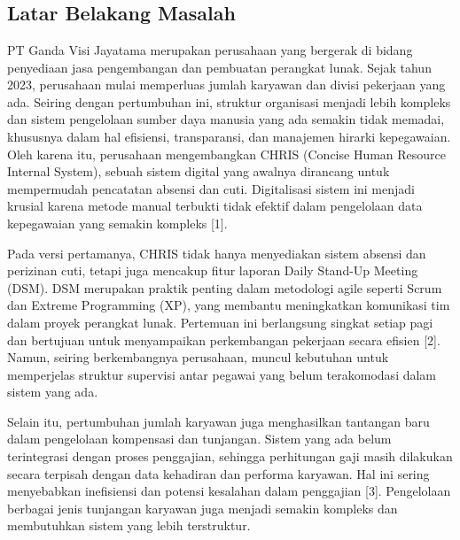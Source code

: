 \chapter{\babSatu}

\section{Latar Belakang Masalah}
PT Ganda Visi Jayatama merupakan perusahaan yang bergerak di bidang penyediaan 
jasa pengembangan dan pembuatan perangkat lunak. Sejak tahun 2023, perusahaan 
mulai memperluas jumlah karyawan dan divisi pekerjaan yang ada. Seiring dengan 
pertumbuhan ini, struktur organisasi menjadi lebih kompleks dan sistem pengelolaan 
sumber daya manusia yang ada semakin tidak memadai, khususnya dalam hal 
efisiensi, transparansi, dan manajemen hirarki kepegawaian. Oleh karena itu, 
perusahaan mengembangkan CHRIS (Concise Human Resource Internal System), sebuah 
sistem digital yang awalnya dirancang untuk mempermudah pencatatan absensi dan 
cuti. Digitalisasi sistem ini menjadi krusial karena metode manual terbukti tidak 
efektif dalam pengelolaan data kepegawaian yang semakin kompleks [1].

Pada versi pertamanya, CHRIS tidak hanya menyediakan sistem absensi dan perizinan 
cuti, tetapi juga mencakup fitur laporan Daily Stand-Up Meeting (DSM). DSM 
merupakan praktik penting dalam metodologi agile seperti Scrum dan Extreme 
Programming (XP), yang membantu meningkatkan komunikasi tim dalam proyek 
perangkat lunak. Pertemuan ini berlangsung singkat setiap pagi dan bertujuan 
untuk menyampaikan perkembangan pekerjaan secara efisien [2]. Namun, seiring 
berkembangnya perusahaan, muncul kebutuhan untuk memperjelas struktur supervisi 
antar pegawai yang belum terakomodasi dalam sistem yang ada.

Selain itu, pertumbuhan jumlah karyawan juga menghasilkan tantangan baru dalam 
pengelolaan kompensasi dan tunjangan. Sistem yang ada belum terintegrasi dengan 
proses penggajian, sehingga perhitungan gaji masih dilakukan secara terpisah 
dengan data kehadiran dan performa karyawan. Hal ini sering menyebabkan 
inefisiensi dan potensi kesalahan dalam penggajian [3]. Pengelolaan berbagai 
jenis tunjangan karyawan juga menjadi semakin kompleks dan membutuhkan sistem 
yang lebih terstruktur.

